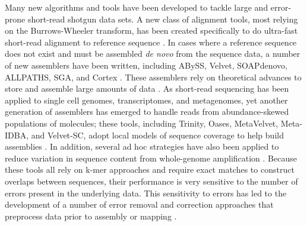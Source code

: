 \documentclass{pnastwo}
\begin{document}
\begin{article}
Many new algorithms and tools have been developed to tackle large and
error-prone short-read shotgun data sets. A new class of alignment
tools, most relying on the Burrows-Wheeler transform, has been created
specifically to do ultra-fast short-read alignment to reference
sequence \cite{pubmed19430453}.  In cases where a reference sequence
does not exist and must be assembled {\em de novo} from the sequence
data, a number of new assemblers have been written, including ABySS,
Velvet, SOAPdenovo, ALLPATHS, SGA, and Cortex
\cite{pubmed19251739,pubmed18349386,pubmed20511140,pubmed21187386,pubmed22156294,cortex}.
These assemblers rely on theoretical advances to store and assemble
large amounts of data \cite{pubmed22068540,pubmed20529929}.  As
short-read sequencing has been applied to single cell genomes,
transcriptomes, and metagenomes, yet another generation of assemblers
has emerged to handle reads from abundance-skewed populations of
molecules; these tools, including Trinity, Oases, MetaVelvet,
Meta-IDBA, and Velvet-SC, adopt local models of sequence coverage to
help build assemblies
\cite{pubmed21572440,pubmed22368243,metavelvet,pubmed21685107,pubmed21926975}.
In addition, several ad hoc strategies have also been applied to reduce
variation in sequence content from whole-genome amplification
\cite{pubmed19724646,pubmed22028825}.
Because these tools all rely on k-mer approaches and require exact
matches to construct overlaps between sequences, their performance is
very sensitive to the number of errors present in the underlying data.
This sensitivity to errors has led to the development of a number of
error removal and correction approaches that preprocess data prior to
assembly or mapping
\cite{pubmed21685062,pubmed15059830,pubmed21114842}.



\end{article}
\end{document}

